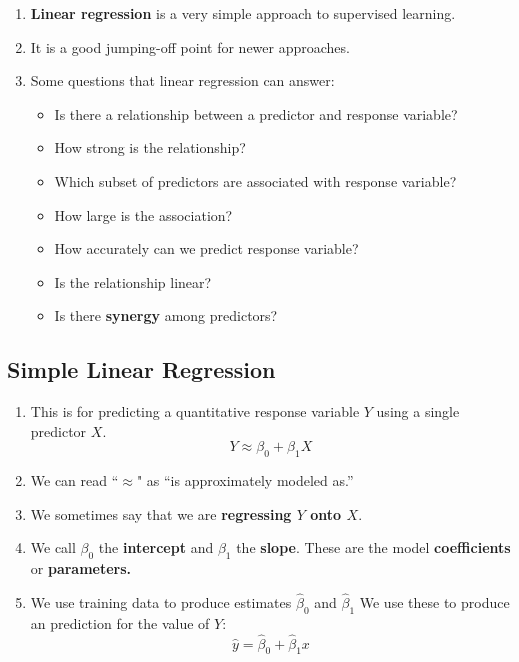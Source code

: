 \documentclass[10pt]{article}
\begin{document}
\begin{enumerate}
	\item \textbf{Linear regression }is a very simple approach to supervised learning.
	\item It is a good jumping-off point for newer approaches.
	\item Some questions that linear regression can answer:
	\begin{itemize}
		\item Is there a relationship between a predictor and response variable?
		\item How strong is the relationship?
		\item Which subset of predictors are associated with response variable?
		\item How large is the association?
		\item How accurately can we predict response variable?
		\item Is the relationship linear?
		\item Is there \textbf{synergy} among predictors?
	\end{itemize}
\end{enumerate}

\vspace{.2in} 

\subsection{Simple Linear Regression} 
\begin{enumerate}
	\item This is for predicting a quantitative response variable $Y$ using a single predictor $X$.
	$$ Y \approx \beta_0 + \beta_1 X$$
	\item We can read ``$\approx$" as ``is approximately modeled as.'' 
	\item We sometimes say that we are \textbf{regressing $Y$ onto $X$}.
	\item We call $\beta_0$ the \textbf{intercept} and $\beta_1$ the \textbf{slope}. These are the model \textbf{coefficients} or \textbf{parameters.} 
	\item We use training data to produce estimates $\hat \beta_0$ and $\hat \beta_1$  We use these to produce an prediction for the value of $Y$:
	$$\hat y = \hat \beta_0 + \hat \beta_1 x$$
\end{enumerate}
\end{document}
